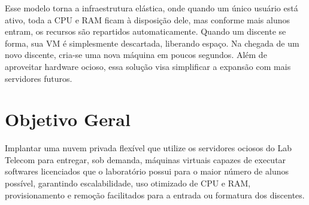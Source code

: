 Esse modelo torna a infraestrutura elástica, onde quando um único usuário está ativo, toda a CPU e RAM ficam à disposição dele, mas conforme mais alunos entram, os recursos são repartidos automaticamente. Quando um discente se forma, sua VM é simplesmente descartada, liberando espaço. Na chegada de um novo discente, cria-se uma nova máquina em poucos segundos. Além de aproveitar hardware ocioso, essa solução visa simplificar a expansão com mais servidores futuros.

\section{Objetivo Geral}
Implantar uma nuvem privada flexível que utilize os servidores ociosos do Lab Telecom para entregar, sob demanda, máquinas virtuais capazes de executar softwares licenciados que o laboratório possui para o maior número de alunos possível, garantindo escalabilidade, uso otimizado de CPU e RAM, provisionamento e remoção facilitados para a entrada ou formatura dos discentes.

